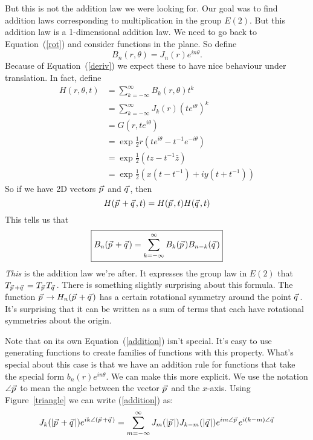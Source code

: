 \documentclass{article}
\newcommand\myvec[1]{\vec{#1}\hspace{0.5mm}}
\begin{document}
But this is not the addition law we were looking for.
Our goal was to find addition laws corresponding to multiplication in the group $E(2)$.
But this addition law is a 1-dimensional addition law.
We need to go back to Equation~(\ref{rot}) and consider functions in the plane.
So define
\[
\boxed{B_n(r,\theta) = J_n(r)e^{in\theta}}.
\]
Because of Equation~(\ref{deriv}) we expect these to have nice behaviour under translation.
In fact, define
\begin{align*}
H(r,\theta,t) &= \sum_{k=-\infty}^\infty B_k(r,\theta)t^k \\
&= \sum_{k=-\infty}^\infty J_k(r)(te^{i\theta})^k \\
&= G(r,te^{i\theta}) \\
&= \exp\frac{1}{2}r(te^{i\theta}-t^{-1}e^{-i\theta}) \\
&= \exp\frac{1}{2}(tz-t^{-1}\bar{z}) \\
&= \exp\frac{1}{2}(x(t-t^{-1})+iy(t+t^{-1}))
\end{align*}
So if we have 2D vectors $\myvec{p}$ and $\myvec{q}$, then
\[
H(\myvec{p}+\myvec{q},t) = H(\myvec{p},t)H(\myvec{q},t)
\]
This tells us that
\begin{equation}
\boxed{B_n(\myvec{p}+\myvec{q}) = \sum_{k=-\infty}^\infty B_k(\myvec{p})B_{n-k}(\myvec{q})}\label{addition}
\end{equation}
\textit{This} is the addition law we're after.
It expresses the group law in $E(2)$ that $T_{\myvec{p}+\myvec{q}}=T_{\myvec{p}}T_{\myvec{q}}$.
There is something slightly surprising about this formula.
The function $\myvec{p}\rightarrow H_n(\myvec{p}+\myvec{q})$ has a certain rotational symmetry around the point $\myvec{q}$.
It's surprising that it can be written as a sum of terms that each have rotational symmetries about the origin.

Note that on its own Equation~(\ref{addition}) isn't special.
It's easy to use generating functions to create families of functions with this property.
What's special about this case is that we have an addition rule for functions that take the special form $b_n(r)e^{in\theta}$.
We can make this more explicit.
We use the notation $\angle\myvec{p}$ to mean the angle between the vector $\myvec{p}$ and the $x$-axis.
Using Figure~\ref{triangle} we can write (\ref{addition}) as:
\[
J_k(|\myvec{p}+\myvec{q}|)e^{ik\angle(\myvec{p}+\myvec{q})} = \sum_{m=-\infty}^\infty J_m(|\myvec{p}|)J_{k-m}(|\myvec{q}|)e^{im\angle\myvec{p}}e^{i(k-m)\angle\myvec{q}}
\]

\end{document}
